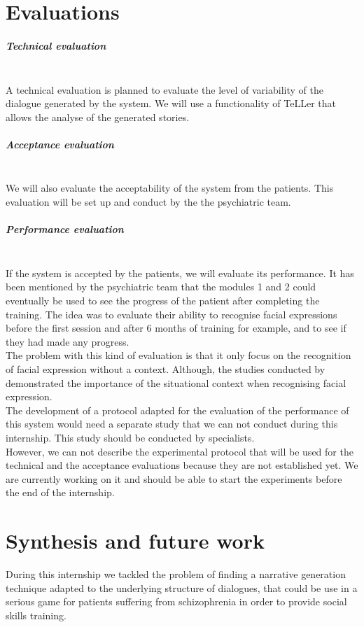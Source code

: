 \documentclass[11pt]{article}
\begin{document}
\section{Evaluations} \label{sec: Evaluations}
\subparagraph{Technical evaluation}\mbox{}\\
A technical evaluation is planned to evaluate the level of variability of the dialogue generated by the system. We will use a functionality of TeLLer that allows the analyse of the generated stories. 
\subparagraph{Acceptance evaluation}\mbox{}\\
We will also evaluate the acceptability of the system from the patients. This evaluation will be set up and conduct by the the psychiatric team.
\subparagraph{Performance evaluation}\mbox{}\\
If the system is accepted by the patients, we will evaluate its performance. It has been mentioned by the psychiatric team that the modules 1 and 2 could eventually be used to see the progress of the patient after completing the training. The idea was to evaluate their ability to recognise facial expressions before the first session and after 6 months of training for example, and to see if they had made any progress.\\
The problem with this kind of evaluation is that it only focus on the recognition of facial expression without a context. Although, the studies conducted by \citeauthor{Lee13} demonstrated the importance of the situational context when recognising facial expression.\\
The development of a protocol adapted for the evaluation of the performance of this system would need a separate study that we can not conduct during this internship. This study should be conducted by specialists.\mbox{}\\

However, we can not describe the experimental protocol that will be used for the technical and the acceptance evaluations because they are not established yet. We are currently working on it and should be able to start the experiments before the end of the internship. \\
\newpage
\section{Synthesis and future work}\label{sec: Conclusion and future work}
During this internship we tackled the problem of finding a narrative generation technique adapted to the underlying structure of dialogues, that could be use in a serious game for patients suffering from schizophrenia in order to provide social skills training. \\
\end{document}
